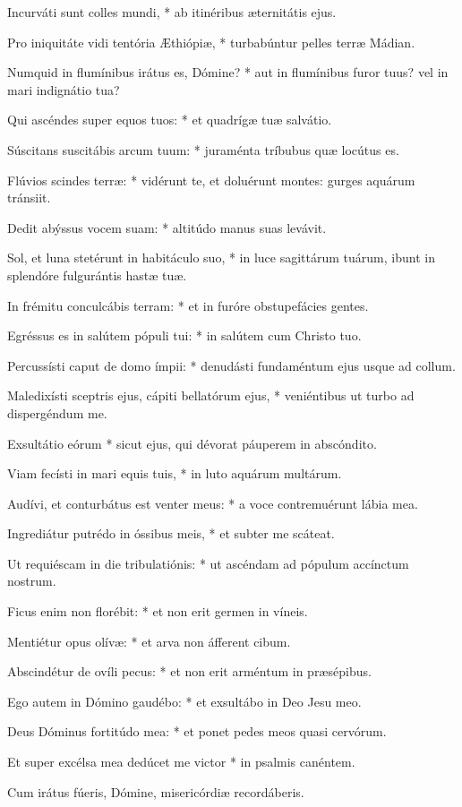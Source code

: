 Incurváti sunt colles mundi, * ab itinéribus æternitátis ejus.

Pro iniquitáte vidi tentória Æthiópiæ, * turbabúntur pelles terræ Mádian.

Numquid in flumínibus irátus es, Dómine? * aut in flumínibus furor tuus? vel in mari indignátio tua?

Qui ascéndes super equos tuos: * et quadrígæ tuæ salvátio.

Súscitans suscitábis arcum tuum: * juraménta tríbubus quæ locútus es.

Flúvios scindes terræ: * vidérunt te, et doluérunt montes: gurges aquárum tránsiit.

Dedit abýssus vocem suam: * altitúdo manus suas levávit.

Sol, et luna stetérunt in habitáculo suo, * in luce sagittárum tuárum, ibunt in splendóre fulgurántis hastæ tuæ.

In frémitu conculcábis terram: * et in furóre obstupefácies gentes.

Egréssus es in salútem pópuli tui: * in salútem cum Christo tuo.

Percussísti caput de domo ímpii: * denudásti fundaméntum ejus usque ad collum.

Maledixísti sceptris ejus, cápiti bellatórum ejus, * veniéntibus ut turbo ad dispergéndum me.

Exsultátio eórum * sicut ejus, qui dévorat páuperem in abscóndito.

Viam fecísti in mari equis tuis, * in luto aquárum multárum.

Audívi, et conturbátus est venter meus: * a voce contremuérunt lábia mea.

Ingrediátur putrédo in óssibus meis, * et subter me scáteat.

Ut requiéscam in die tribulatiónis: * ut ascéndam ad pópulum accínctum nostrum.

Ficus enim non florébit: * et non erit germen in víneis.

Mentiétur opus olívæ: * et arva non áfferent cibum.

Abscindétur de ovíli pecus: * et non erit arméntum in præsépibus.

Ego autem in Dómino gaudébo: * et exsultábo in Deo Jesu meo.

Deus Dóminus fortitúdo mea: * et ponet pedes meos quasi cervórum.

Et super excélsa mea dedúcet me victor * in psalmis canéntem.

 Cum irátus fúeris, Dómine, misericórdiæ recordáberis.

